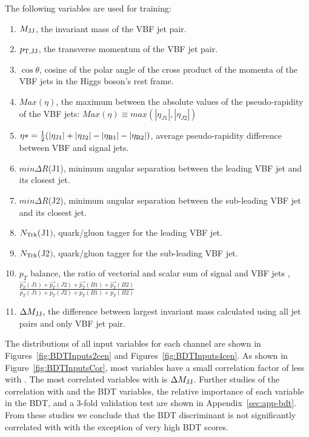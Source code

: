 The following variables are used for training:
\begin{enumerate}
\item $M_{\rm JJ}$, the invariant mass of the VBF jet pair. 
\item $p_{\rm T,JJ}$, the transverse momentum of the VBF jet pair. 
\item $\cos{\theta}$, cosine of the polar angle of the cross product of the momenta of the VBF jets in the Higgs boson's rest frame.
\item $Max (\eta)$, the maximum between the absolute values of the pseudo-rapidity of the VBF jets: $Max (\eta) \equiv max( |\eta_{J1}|, |\eta_{J2}| )$
\item $\eta* = \frac{1}{2}( |\eta_{\rm J1}| + |\eta_{\rm J2}| - |\eta_{\rm B1}| - |\eta_{\rm B2}|)$, average pseudo-rapidity difference between VBF and signal jets.
\item $min\Delta R$(J1), minimum angular separation between the leading VBF jet and its closest jet. 
\item $min\Delta R$(J2), minimum angular separation between the sub-leading VBF jet and its closest jet. 
\item $N_{\rm Trk}($J1$)$, quark/gluon tagger for the leading VBF jet.
\item $N_{\rm Trk}($J2$)$, quark/gluon tagger for the sub-leading VBF jet.
\item $p_{T}$ balance, the ratio of vectorial and scalar sum of signal and VBF jets \pT,  $\frac{ \overrightarrow{p_{T}}(J1)+\overrightarrow{p_{T}}(J2)+\overrightarrow{p_{T}}(B1)+\overrightarrow{p_{T}}(B2) }{ p_{T}(J1)+p_{T}(J2)+p_{T}(B1)+p_{T}(B2)  }$
\item $\Delta M_{\rm JJ}$, the difference between largest invariant mass calculated using all jet pairs and only VBF jet pair. 

\end{enumerate}


The distributions of all input variables for each channel are shown in Figures~\ref{fig:BDTInputs2cen} and Figures~\ref{fig:BDTInputs4cen}. As shown in Figure~\ref{fig:BDTInputsCor}, most variables have a small correlation factor of less with \Mbb.  The most correlated variables with \Mbb is $\Delta M_{\rm JJ}$. Further studies of the correlation with \Mbb and the BDT variables, the relative importance of each variable in the BDT, and a 3-fold validation test are shown in Appendix~\ref{sec:app-bdt}. From these studies we conclude that the BDT discriminant is not significantly correlated with \Mbb with the exception of very high BDT scores.

